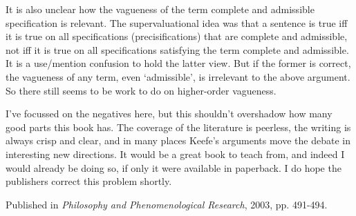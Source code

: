 \documentclass[
  11pt,
  letterpaper,
  DIV=11,
  numbers=noendperiod,
  twoside]{scrartcl}
\begin{document}
It is also unclear how the vagueness of the term complete and admissible
specification is relevant. The supervaluational idea was that a sentence
is true iff it is true on all specifications (precisifications) that are
complete and admissible, not iff it is true on all specifications
satisfying the term complete and admissible. It is a use/mention
confusion to hold the latter view. But if the former is correct, the
vagueness of any term, even `admissible', is irrelevant to the above
argument. So there still seems to be work to do on higher-order
vagueness.

I've focussed on the negatives here, but this shouldn't overshadow how
many good parts this book has. The coverage of the literature is
peerless, the writing is always crisp and clear, and in many places
Keefe's arguments move the debate in interesting new directions. It
would be a great book to teach from, and indeed I would already be doing
so, if only it were available in paperback. I do hope the publishers
correct this problem shortly.

\vspace{1cm}



\noindent Published in\emph{
Philosophy and Phenomenological Research}, 2003, pp. 491-494.
\end{document}
